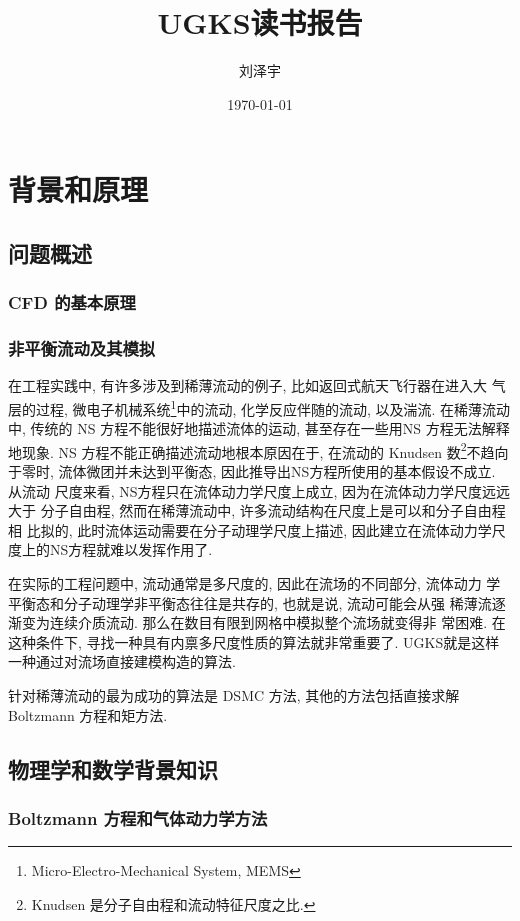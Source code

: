 \documentclass[hyperref,UTF8,titlepage]{ctexbook}
\title{UGKS读书报告}
\author{刘泽宇}
\date{\today}
\begin{document}
\maketitle

\part{背景和原理}
\chapter{问题概述}

\section{CFD 的基本原理}

\section{非平衡流动及其模拟}
在工程实践中, 有许多涉及到稀薄流动的例子, 比如返回式航天飞行器在进入大
气层的过程, 微电子机械系统\footnote{Micro-Electro-Mechanical System,
  MEMS}中的流动,
化学反应伴随的流动, 以及湍流.
在稀薄流动中, 传统的 NS 方程不能很好地描述流体的运动, 甚至存在一些用NS
方程无法解释地现象. NS 方程不能正确描述流动地根本原因在于, 在流动的
Knudsen 数\footnote{Knudsen 是分子自由程和流动特征尺度之比.}不趋向于零时,
流体微团并未达到平衡态, 因此推导出NS方程所使用的基本假设不成立. 从流动
尺度来看, NS方程只在流体动力学尺度上成立, 因为在流体动力学尺度远远大于
分子自由程, 然而在稀薄流动中, 许多流动结构在尺度上是可以和分子自由程相
比拟的, 此时流体运动需要在分子动理学尺度上描述, 因此建立在流体动力学尺
度上的NS方程就难以发挥作用了.

在实际的工程问题中, 流动通常是多尺度的, 因此在流场的不同部分, 流体动力
学平衡态和分子动理学非平衡态往往是共存的, 也就是说, 流动可能会从强
稀薄流逐渐变为连续介质流动. 那么在数目有限到网格中模拟整个流场就变得非
常困难. 在这种条件下, 寻找一种具有内禀多尺度性质的算法就非常重要了.
UGKS就是这样一种通过对流场直接建模构造的算法.

针对稀薄流动的最为成功的算法是 DSMC 方法, 其他的方法包括直接求解
Boltzmann 方程和矩方法.





\chapter{物理学和数学背景知识}

\section{Boltzmann 方程和气体动力学方法}
\end{document}

